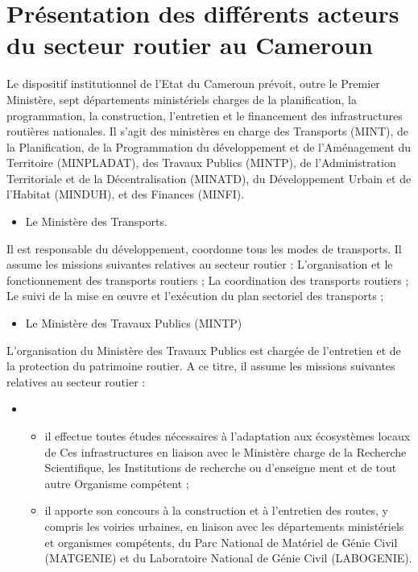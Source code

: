 \section[Présentation des différents acteurs du secteur routier au Cameroun]{Présentation des différents acteurs du secteur routier au Cameroun}
Le dispositif institutionnel de l'Etat du Cameroun prévoit, outre le Premier Ministère, sept départements ministériels charges de la planification, la programmation, la construction, l'entretien et le financement des infrastructures routières nationales. Il s'agit des ministères en charge des
Transports (MINT), de la Planification, de la Programmation du développement et de l'Aménagement du Territoire (MINPLADAT), des Travaux Publics (MINTP), de l'Administration Territoriale et de la Décentralisation (MINATD), du Développement Urbain et de l'Habitat (MINDUH), et des Finances (MINFI).
\begin{itemize}
\item Le Ministère des Transports. 
\end{itemize}
Il est responsable du développement, coordonne tous les modes de transports.
Il assume les missions suivantes relatives au secteur routier :
 L’organisation et le fonctionnement des transports routiers ;
 La coordination des transports routiers ;
 Le suivi de la mise en œuvre et l'exécution du plan sectoriel des transports ;
\begin{itemize}
\item Le Ministère des Travaux Publics (MINTP)
\end{itemize}
L'organisation du Ministère des Travaux Publics est chargée de l'entretien et de la protection du patrimoine routier.
A ce titre, il assume les missions suivantes relatives au secteur routier :
\begin{itemize}
\item[] 
\begin{itemize}
\item il effectue toutes études nécessaires à l'adaptation aux écosystèmes locaux de
Ces infrastructures en liaison avec le Ministère charge de la Recherche
Scientifique, les Institutions de recherche ou d'enseigne ment et de tout autre
Organisme compétent ;
\item il apporte son concours à la construction et à l'entretien des routes, y compris les voiries urbaines, en liaison avec les départements ministériels et organismes compétents, du Parc National de Matériel de Génie Civil (MATGENIE) et du Laboratoire National de Génie Civil (LABOGENIE).
\end{itemize}
\end{itemize}
